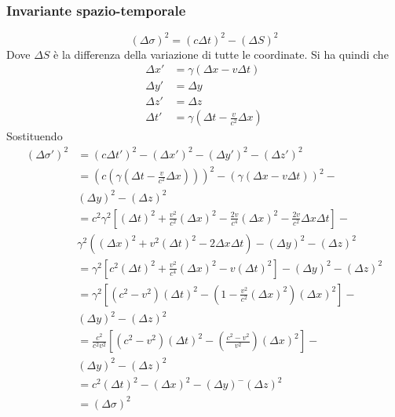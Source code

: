 \subsubsection{Invariante spazio-temporale}
\begin{equation*}
  {(\Delta\sigma)}^2={(c\Delta t)}^2-{(\Delta S)}^2
\end{equation*}
Dove $\Delta S$ è la differenza della variazione di tutte le coordinate. Si ha quindi che
\begin{align*}
  \Delta x' &= \gamma(\Delta x-v\Delta t)\\
  \Delta y' &= \Delta y\\
  \Delta z' &= \Delta z\\
  \Delta t' &= \gamma \left( \Delta t-\frac{v}{c^2}\Delta x \right)
\end{align*}
Sostituendo
\begin{align*}
  {(\Delta\sigma')}^2 
  &= {(c\Delta t')}^2-{(\Delta x')}^2-{(\Delta y')}^2-{(\Delta z')}^2\\
  &= {\left(c\left(\gamma \left( \Delta t-\frac{v}{c^2}\Delta x \right)\right)\right)}^2-
  {\left( \gamma \left( \Delta x-v\Delta t \right) \right)}^2-\\
  &{(\Delta y)}^2-{(\Delta z)}^2\\
  &= c^2\gamma^2 \left[ {(\Delta t)}^2+\frac{v^2}{c^2}{(\Delta x)}^2-\frac{2v}{c^4}{(\Delta x)}^2 -
\frac{2v}{c^2}\Delta x\Delta t\right]-\\
&\gamma^2({(\Delta x)}^2+v^2{(\Delta t)}^2-2\Delta x\Delta t)-{(\Delta y)}^2-{(\Delta z)}^2\\
&=\gamma^2 \left[ c^2{(\Delta t)}^2+\frac{v^2}{c^4}{(\Delta x)}^2-v{(\Delta t)}^2 \right]-
{(\Delta y)}^2-{(\Delta z)}^2\\
&=\gamma^2 \left[ (c^2-v^2){(\Delta t)}^2-\left( 1-\frac{v^2}{c^2}
  {(\Delta x)}^2 \right){(\Delta x)}^2 \right]-\\
  &{(\Delta y)}^2-
  {(\Delta z)}^2\\
  &=\frac{c^2}{c^2v^2}\left[ (c^2-v^2){(\Delta t)}^2-\left( \frac{c^2-v^2}{v^2}
  \right){(\Delta x)}^2 \right]-\\
  &{(\Delta y)}^2-{(\Delta z)}^2\\
  &=c^2{(\Delta t)}^2-{(\Delta x)}^2-{(\Delta y)}^-{(\Delta z)}^2\\
  &={(\Delta\sigma)}^2
\end{align*}

